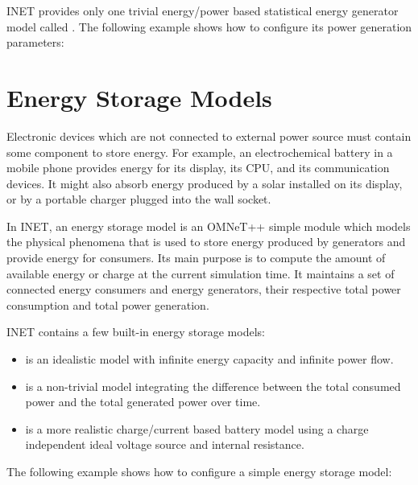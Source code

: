 INET provides only one trivial energy/power based statistical energy
generator model called . The following
example shows how to configure its power generation parameters:


\section{Energy Storage Models}
\label{sec:power:energy-storage-models}

Electronic devices which are not connected to external power source must contain
some component to store energy. For example, an electrochemical battery in a
mobile phone provides energy for its display, its CPU, and its communication
devices. It might also absorb energy produced by a solar installed on its
display, or by a portable charger plugged into the wall socket.

In INET, an energy storage model is an OMNeT++ simple module which models
the physical phenomena that is used to store energy produced by generators
and provide energy for consumers. Its main purpose is to compute the amount
of available energy or charge at the current simulation time. It maintains
a set of connected energy consumers and energy generators, their respective
total power consumption and total power generation.

INET contains a few built-in energy storage models:

\begin{itemize}
        \item {} is an idealistic model with infinite energy capacity and infinite power flow.
        \item {} is a non-trivial model integrating the difference between the total consumed power and the total generated power over time.
        \item {} is a more realistic charge/current based battery model using a charge independent ideal voltage source and internal resistance.
\end{itemize}

The following example shows how to configure a simple energy storage model:


